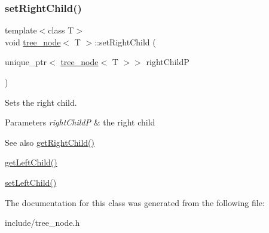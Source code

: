 \subsubsection{\texorpdfstring{set\+Right\+Child()}{setRightChild()}}
{\footnotesize\ttfamily template$<$class T$>$ \\
void \hyperlink{classtree__node}{tree\+\_\+node}$<$ T $>$\+::set\+Right\+Child (\begin{DoxyParamCaption}\item[{unique\+\_\+ptr$<$ \hyperlink{classtree__node}{tree\+\_\+node}$<$ T $>$$>$}]{right\+ChildP }\end{DoxyParamCaption})\hspace{0.3cm}{\ttfamily [inline]}}

Sets the right child. 
\begin{DoxyParams}{Parameters}
{\em right\+ChildP} & the right child \\
\hline
\end{DoxyParams}
\begin{DoxySeeAlso}{See also}
\hyperlink{classtree__node_a5e584d47f2c11941fe0406836fe50159}{get\+Right\+Child()} 

\hyperlink{classtree__node_ae161b70a3780e0cb3ecd4b57acc9e2d1}{get\+Left\+Child()} 

\hyperlink{classtree__node_a3db979969a0fe8505ba65c7afabb5463}{set\+Left\+Child()} 
\end{DoxySeeAlso}


The documentation for this class was generated from the following file\+:\begin{DoxyCompactItemize}
\item 
include/tree\+\_\+node.\+h\end{DoxyCompactItemize}
